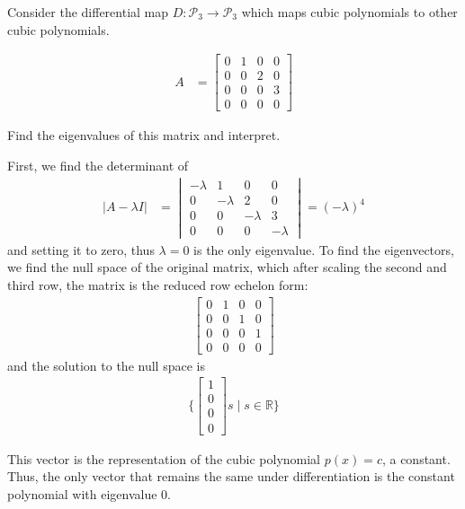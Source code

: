 \begin{example}
Consider the differential map $D: \mathcal{P}_3 \rightarrow \mathcal{P}_3$ which maps cubic polynomials to other cubic polynomials. 

\begin{align*}
A & = \begin{bmatrix}
0 & 1 & 0 & 0 \\
0 & 0 & 2 & 0 \\
0 & 0 & 0 & 3 \\
0 & 0 & 0 & 0 
\end{bmatrix}
\end{align*}

Find the eigenvalues of this matrix and interpret. 

\solution

First, we find the determinant of 
%
\begin{align*}
|A-\lambda I| & = \begin{vmatrix}
-\lambda & 1 & 0 & 0 \\
0 & -\lambda & 2 & 0 \\
0 & 0 & -\lambda & 3 \\
0 & 0 & 0 & -\lambda 
\end{vmatrix} = (-\lambda)^4 
\end{align*}
and setting it to zero, thus $\lambda=0$ is the only eigenvalue.  To find the eigenvectors, we find the null space of the original matrix, which after scaling the second and third row, the matrix is the reduced row echelon form:
%
\begin{align*}
 \begin{bmatrix}
0 & 1 & 0 & 0 \\
0 & 0 & 1 & 0 \\
0 & 0 & 0 & 1 \\
0 & 0 & 0 & 0 
\end{bmatrix}
\end{align*}
and the solution to the null space is
%
\begin{align*}
\{ \begin{bmatrix}
1 \\ 0 \\ 0 \\ 0
\end{bmatrix} s \; | \; s \in \mathbb{R} \} 
\end{align*}

This vector is the representation of the cubic polynomial $p(x)=c$, a constant.   Thus, the only vector that remains the same under differentiation is the constant polynomial with eigenvalue 0.  

\end{example}


